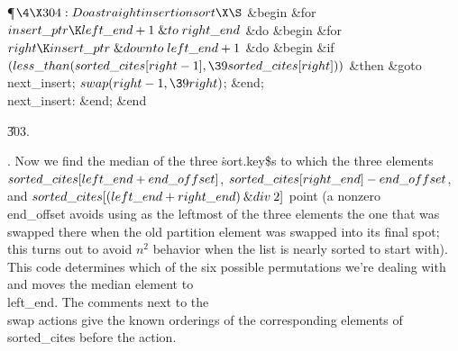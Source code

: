\Y\P$\4\X304:Do a straight insertion sort\X\S$\6
\&{begin} \&{for} $\\{insert\_ptr}\K\\{left\_end}+1\mathrel{\&{to}}\\{right%
\_end}$ \1\&{do}\6
\&{begin} \&{for} $\\{right}\K\\{insert\_ptr}\mathrel{\&{downto}}\\{left%
\_end}+1$ \1\&{do}\6
\&{begin} \&{if} $(\\{less\_than}(\\{sorted\_cites}[\\{right}-1],\39%
\\{sorted\_cites}[\\{right}]))$ \1\&{then}\5
\&{goto} \\{next\_insert};\2\6
$\\{swap}(\\{right}-1,\39\\{right})$;\6
\&{end};\2\6
\4\\{next\_insert}: \&{end};\2\6
\&{end}\par
\U303.\fi

.
Now we find the median of the three \.{sort.key\$}s to which the three
elements $\\{sorted\_cites}[\\{left\_end}+\\{end\_offset}]$,
$\\{sorted\_cites}[\\{right\_end}]-\\{end\_offset}$, and
$\\{sorted\_cites}[(\\{left\_end}+\\{right\_end})\mathbin{\&{div}}2]$ point (a
nonzero
\\{end\_offset} avoids using as the leftmost of the three elements the
one that was swapped there when the old partition element was swapped
into its final spot; this turns out to avoid $n^2$ behavior when the
list is nearly sorted to start with).  This code determines which of
the six possible permutations we're dealing with and moves the median
element to \\{left\_end}.  The comments next to the \\{swap} actions give
the known orderings of the corresponding elements of \\{sorted\_cites}
before the action.

